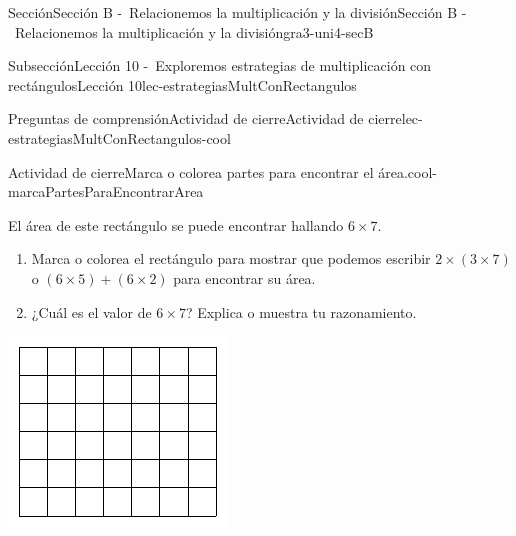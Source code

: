 \documentclass[twoside,10pt,]{article}
\begin{document}
\begin{sectionptx}{Sección}{Sección B -~Relacionemos la multiplicación y la división}{}{Sección B -~Relacionemos la multiplicación y la división}{}{}{gra3-uni4-secB}
\begin{subsectionptx}{Subsección}{Lección 10 -~Exploremos estrategias de multiplicación con rectángulos}{}{Lección 10}{}{}{lec-estrategiasMultConRectangulos}
\begin{reading-questions-subsubsection}{Preguntas de comprensión}{Actividad de cierre}{}{Actividad de cierre}{}{}{lec-estrategiasMultConRectangulos-cool}
\begin{project}{Actividad de cierre}{Marca o colorea partes para encontrar el área.}{cool-marcaPartesParaEncontrarArea}%
\begin{sidebyside}{2}{0}{0}{0}%
\begin{sbspanel}{0.6}%
El área de este rectángulo se puede encontrar hallando \(6 \times 7\).%
%
\begin{enumerate}[label={(\alph*)}]
\item{}Marca o colorea el rectángulo para mostrar que podemos escribir \(2 \times (3 \times 7)\) o \((6 \times 5) + (6 \times 2)\) para encontrar su área.%
\item{}¿Cuál es el valor de \(6 \times 7\)? Explica o muestra tu razonamiento.%
\end{enumerate}
\end{sbspanel}%
\begin{sbspanel}{0.4}%
\includegraphics[width=\linewidth]{external/svg-source/tikz-file-153042.pdf}
\end{sbspanel}%
\end{sidebyside}%
\end{project}%
\end{reading-questions-subsubsection}
\end{subsectionptx}
%
%
\typeout{************************************************}
\typeout{************************************************}

\end{sectionptx}
\end{document}
